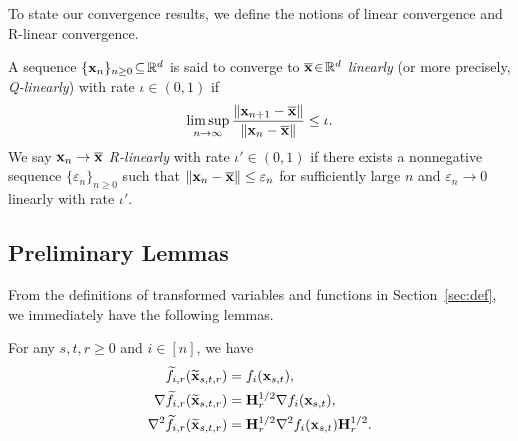 \documentclass[10pt,twocolumn,journal]{IEEEtran}
\begin{document}
To state our convergence results, we define the notions of linear convergence and R-linear convergence. 

\begin{definition}\label{def:linear_conv}
A sequence $\{\mathbf{x}_n\}_{n\ge 0}\!\subseteq\!\mathbb{R}^d$ is said to converge to $\overline{\bf x}\!\in\!\mathbb{R}^d$ {\em linearly} (or more precisely, {\em Q-linearly}) with rate $\iota\in(0,1)$ if 
\begin{equation}
\limsup_{n\to\infty} \frac{\Vert\mathbf{x}_{n+1}-\overline{\bf x}\Vert}{\Vert\mathbf{x}_{n}-\overline{\bf x}\Vert} \le \iota. \label{eqn:qlinear}
\end{equation}
We say $\mathbf{x}_n\to\overline{\bf x}$ {\em R-linearly} with rate $\iota'\in(0,1)$ if there exists a nonnegative sequence $\{\varepsilon_n\}_{n\ge 0}$ such that $\Vert\mathbf{x}_{n}-\overline{\bf x}\Vert\le \varepsilon_n$ for sufficiently large $n$ and  $\varepsilon_n\to 0$ linearly with rate $\iota'$. 
\end{definition}

\subsection{Preliminary Lemmas}\label{sec:prelim}

From the definitions of transformed variables and functions in Section~\ref{sec:def}, we immediately have the following  lemmas. %

\begin{lemma}\label{lem:tilf_equiv}
For any $s,t,r\ge 0$ and $i\in[n]$, we have
\begin{align}
\widetilde{f}_{i,r}(\widetilde{\mathbf{x}}_{s,t,r})&=f_i(\mathbf{x}_{s,t}),\label{eq:tilf}\\
\nabla \widetilde{f}_{i,r}(\widetilde{\mathbf{x}}_{s,t,r})&= \mathbf{H}_r^{1/2} \nabla f_i(\mathbf{x}_{s,t}),\label{eq:grad_tilf}\\
\nabla^2 \widetilde{f}_{i,r}(\widetilde{\mathbf{x}}_{s,t,r})&= \mathbf{H}_r^{1/2} \nabla^2 f_i(\mathbf{x}_{s,t})\mathbf{H}_r^{1/2}.\label{eq:Hessian_tilf}
\end{align}
\end{lemma}
\end{document}
